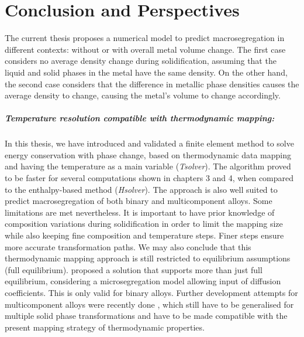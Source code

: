 \chapter*{Conclusion and Perspectives}
\pagestyle{plain}

The current thesis proposes a numerical model to predict macrosegregation in different contexts: without or
with overall metal volume change. The first case considers no average density change during solidification, 
assuming that the liquid and solid phases in the metal have the same density. 
On the other hand, the second case considers that the difference in metallic 
phase densities causes the average density to change, causing the metal's volume to
change accordingly. 

\paragraph{Temperature resolution compatible with thermodynamic mapping:}
In this thesis, we have introduced and validated a finite element method to solve energy conservation with phase change, based 
on thermodynamic data mapping and having the temperature as a main variable (\emph{Tsolver}). The algorithm proved to be faster for several computations
shown in chapters 3 and 4, when compared to the enthalpy-based method (\emph{Hsolver}). The approach is also well suited to predict macrosegregation
of both binary and multicomponent alloys. Some limitations are met nevertheless. It is important to have prior knowledge of composition variations
during solidification in order to limit the mapping size while also keeping fine composition and temperature steps.
Finer steps ensure more accurate transformation paths. We may also conclude that this thermodynamic mapping approach is still
restricted to equilibrium assumptions (full equilibrium). \citet{tourret_multiple_2011} proposed
a solution that supports more than just full equilibrium, considering a microsegregation model allowing input of diffusion coefficients.
This is only valid for binary alloys. Further development attempts for multicomponent alloys were recently done \citep{guillemot_analytical_2015}, which
still have to be generalised for multiple solid phase transformations and have to be made compatible with the present mapping strategy of thermodynamic
properties.

